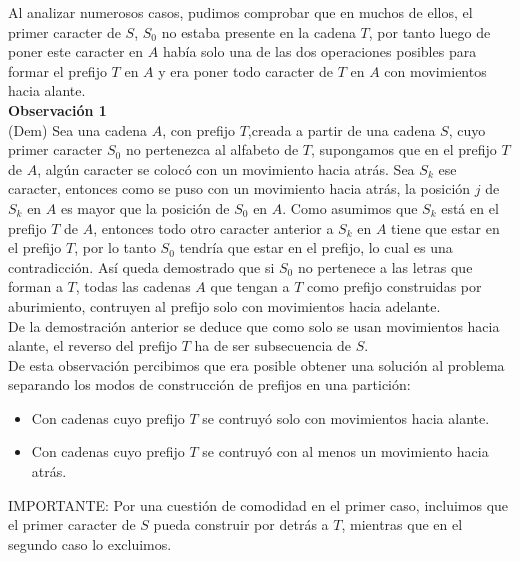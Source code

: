 \documentclass[a4paper]{article}
\begin{document}
    Al analizar numerosos casos, pudimos comprobar que en muchos de ellos, el primer caracter de $S$, $S_0$ no estaba presente en la cadena $T$, por tanto 
    luego de poner este caracter en $A$ hab\'ia solo una de las dos operaciones posibles para formar el prefijo $T$ en $A$ y era poner todo caracter de 
    $T$ en $A$ con movimientos hacia alante.\\ 

    \textbf{Observaci\'on 1}\\ 

    (Dem) Sea una cadena $A$, con prefijo $T$,creada a partir de una cadena $S$, cuyo primer caracter $S_0$ no pertenezca al alfabeto de $T$, 
    supongamos que en el prefijo $T$ de $A$, alg\'un caracter se coloc\'o con un movimiento hacia atr\'as. Sea 
    $S_k$ ese caracter, entonces como se puso con un movimiento hacia atr\'as, la posici\'on $j$ de $S_k$ en $A$
    es mayor que la posici\'on de $S_0$ en $A$. Como asumimos que $S_k$ est\'a en el prefijo $T$ de $A$, entonces todo otro caracter anterior 
    a $S_k$ en $A$ tiene que estar en el prefijo $T$, por lo tanto $S_0$ tendr\'ia que estar en el prefijo, lo cual es una contradicci\'on. As\'i queda demostrado que 
    si $S_0$ no pertenece a las letras que forman a $T$, todas las cadenas $A$ que tengan a $T$ como prefijo construidas por aburimiento, 
    contruyen al prefijo solo con movimientos hacia adelante.\\

    De la demostraci\'on anterior se deduce que como solo se usan movimientos hacia alante, el reverso del prefijo $T$ ha de ser subsecuencia de $S$.\\

    De esta observaci\'on percibimos que era posible obtener una soluci\'on al problema separando los modos de construcci\'on de prefijos 
    en una partici\'on: 

    \begin{itemize}
        \item Con cadenas cuyo prefijo $T$ se contruy\'o solo con movimientos hacia alante.
        \item Con cadenas cuyo prefijo $T$ se contruy\'o con al menos un movimiento hacia atr\'as.
    \end{itemize}

	IMPORTANTE: Por una cuestión de comodidad en el primer caso, incluimos que el primer caracter de $S$ pueda construir por detrás a $T$, mientras que en el segundo caso lo excluimos.
\end{document}
